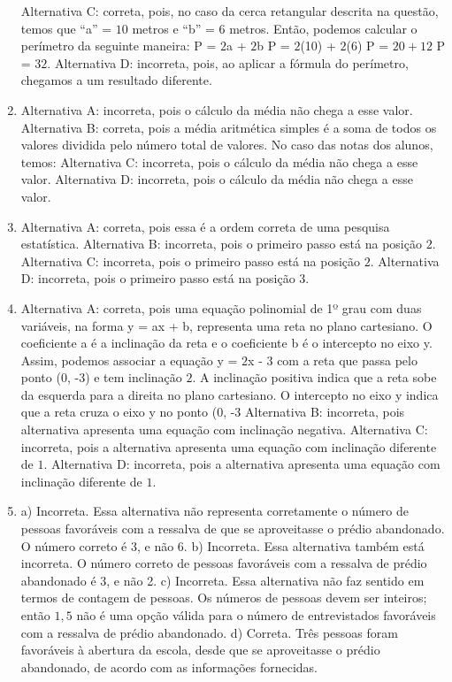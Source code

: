 \begin{enumerate}
Alternativa C: correta, pois, no caso da cerca retangular descrita na
questão, temos que ``a'' = $10$ metros e ``b'' = $6$ metros. Então, podemos
calcular o perímetro da seguinte maneira: P = $2$a + $2$b P = $2$(10) + $2$(6) P = $20 + 12$ P = $32$.
Alternativa D: incorreta, pois, ao aplicar a fórmula do perímetro,
chegamos a um resultado diferente.
\item Alternativa A: incorreta, pois o cálculo da média não chega a esse
valor.
Alternativa B: correta, pois a média aritmética simples é a soma de
todos os valores dividida pelo número total de valores. No caso das
notas dos alunos, temos:
Alternativa C: incorreta, pois o cálculo da média não chega a esse
valor.
Alternativa D: incorreta, pois o cálculo da média não chega a esse
valor.
\item Alternativa A: correta, pois essa é a ordem correta de uma pesquisa
estatística.
Alternativa B: incorreta, pois o primeiro passo está na posição $2$.
Alternativa C: incorreta, pois o primeiro passo está na posição $2$.
Alternativa D: incorreta, pois o primeiro passo está na posição $3$.
\item Alternativa A: correta, pois uma equação polinomial de 1º grau com duas
variáveis, na forma y = ax + b, representa uma reta no plano cartesiano.
O coeficiente a é a inclinação da reta e o coeficiente b é o intercepto
no eixo y. Assim, podemos associar a equação y = $2$x - $3$ com a reta que
passa pelo ponto (0, -3) e tem inclinação $2$. A inclinação positiva
indica que a reta sobe da esquerda para a direita no plano cartesiano. O
intercepto no eixo y indica que a reta cruza o eixo y no ponto (0, -3
Alternativa B: incorreta, pois alternativa apresenta uma equação com
inclinação negativa.
Alternativa C: incorreta, pois a alternativa apresenta uma equação com
inclinação diferente de $1$.
Alternativa D: incorreta, pois a alternativa apresenta uma equação com
inclinação diferente de $1$.
\item a) Incorreta. Essa alternativa não representa corretamente o número de pessoas favoráveis com a ressalva de que se aproveitasse o prédio abandonado. O número correto é 3, e não 6.
b) Incorreta. Essa alternativa também está incorreta. O número correto de pessoas favoráveis com a ressalva de prédio abandonado é 3, e não 2.
c) Incorreta. Essa alternativa não faz sentido em termos de contagem de pessoas. Os números de pessoas devem ser inteiros; então $1,5$ não é uma opção válida para o número de entrevistados favoráveis com a ressalva de prédio abandonado.
d) Correta. Três pessoas foram favoráveis à abertura da escola, desde que se aproveitasse o prédio abandonado, de acordo com as informações fornecidas.

\end{enumerate}

